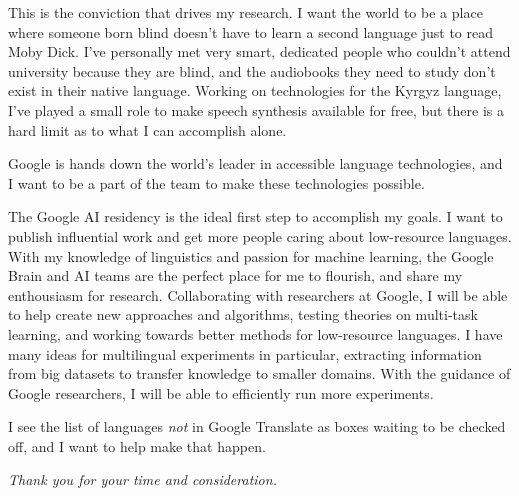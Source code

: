 \documentclass[12pt,a4paper]{article}
\begin{document}
This is the conviction that drives my research. I want the world to be a place where someone born blind doesn't have to learn a second language just to read Moby Dick. I've personally met very smart, dedicated people who couldn't attend university because they are blind, and the audiobooks they need to study don't exist in their native language. Working on technologies for the Kyrgyz language, I've played a small role to make speech synthesis available for free, but there is a hard limit as to what I can accomplish alone.

Google is hands down the world's leader in accessible language technologies, and I want to be a part of the team to make these technologies possible. 

The Google AI residency is the ideal first step to accomplish my goals. I want to publish influential work and get more people caring about low-resource languages. With my knowledge of linguistics and passion for machine learning, the Google Brain and AI teams are the perfect place for me to flourish, and share my enthousiasm for research. Collaborating with researchers at Google, I will be able to help create new approaches and algorithms, testing theories on multi-task learning, and working towards better methods for low-resource languages. I have many ideas for multilingual experiments in particular, extracting information from big datasets to transfer knowledge to smaller domains. With the guidance of Google researchers, I will be able to efficiently run more experiments.

I see the list of languages \textit{not} in Google Translate as boxes waiting to be checked off, and I want to help make that happen.

\begin{center}
\textit{Thank you for your time and consideration.}  
\end{center}
\end{document}
